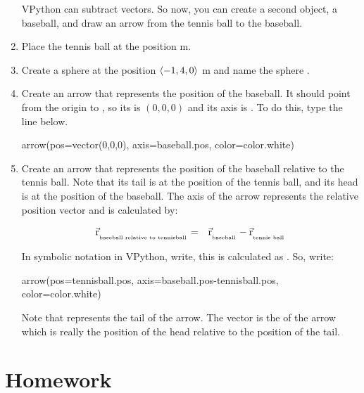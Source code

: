 \begin{enumerate}
VPython can subtract vectors. So now, you can create a second object, a baseball, and draw an arrow from the tennis ball to the baseball.

\item Place the tennis ball at the position  m.

\item Create a sphere at the position $\langle -1, 4 , 0 \rangle$ m and name the sphere .

\item Create an arrow that represents the position of the baseball. It should point from the origin to , so its  is $(0,0,0)$ and its axis is . To do this, type the line below.

\begin{myvpython}
arrow(pos=vector(0,0,0), axis=baseball.pos, color=color.white)
\end{myvpython}

\item Create an arrow that represents the position of the baseball relative to the tennis ball. Note that its tail is at the position of the tennis ball, and its head is at the position of the baseball. The axis of the arrow represents the relative position vector and is calculated by:

\begin{eqnarray*}
	\vec{\mathrm{r}}_{_{_{\mbox{\tiny{baseball relative to tennisball}}}}} & = & \vec{\mathrm{r}}_{_{_{\mbox{\tiny{baseball}}}}} - \vec{\mathrm{r}}_{_{_{\mbox{\tiny{tennis ball}}}}} \\
\end{eqnarray*}

In symbolic notation in VPython, write, this is calculated as . So, write:

\begin{vpythonblock}
arrow(pos=tennisball.pos, axis=baseball.pos-tennisball.pos, color=color.white)
\end{vpythonblock}

Note that  represents the tail of the arrow. The vector is the  of the arrow which is really the position of the head relative to the position of the tail.

\end{enumerate}

\newpage

\section*{Homework}

